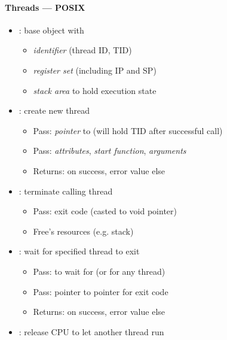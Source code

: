 \paragraph{Threads --- POSIX}
\begin{itemize}
  \item {}: base object with
  \begin{itemize}
    \item \emph{identifier} (thread ID, TID)
    \item \emph{register set} (including IP and SP)
    \item \emph{stack area} to hold execution state
  \end{itemize}
  \item {}: create new thread
  \begin{itemize}
    \item Pass: \emph{pointer} to  (will hold TID after successful call)
    \item Pass: \emph{attributes}, \emph{start function}, \emph{arguments}
    \item Returns:  on success, error value else
  \end{itemize}
  \item {}: terminate calling thread
  \begin{itemize}
    \item Pass: exit code (casted to void pointer)
    \item Free's resources (e.g. stack)
  \end{itemize}
  \item {}: wait for specified thread to exit
  \begin{itemize}
    \item Pass:  to wait for (or  for any thread)
    \item Pass: pointer to pointer for exit code
    \item Returns:  on success, error value else
  \end{itemize}
  \item {}: release CPU to let another thread run
\end{itemize}

